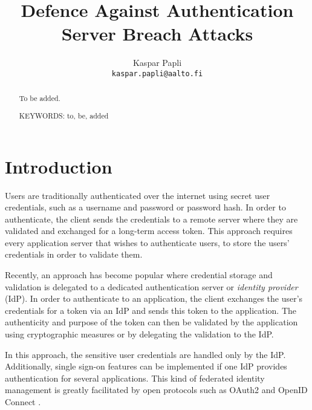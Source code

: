 \documentclass[article]{aaltoseries}
\begin{document}
 

\title{Defence Against Authentication Server Breach Attacks}

\author{Kaspar Papli
\\\textnormal{\texttt{kaspar.papli@aalto.fi}}}


\maketitle


\begin{abstract}
To be added.

\vspace{3mm}
\noindent KEYWORDS: to, be, added

\end{abstract}




\section{Introduction}

Users are traditionally authenticated over the internet using secret user credentials, such as a username and password or password hash. In order to authenticate, the client sends the credentials to a remote server where they are validated and exchanged for a long-term access token. This approach requires every application server that wishes to authenticate users, to store the users' credentials in order to validate them.

Recently, an approach has become popular where credential storage and validation is delegated to a dedicated authentication server or \textit{identity provider} (IdP). In order to authenticate to an application, the client exchanges the user's credentials for a token via an IdP and sends this token to the application. The authenticity and purpose of the token can then be validated by the application using cryptographic measures or by delegating the validation to the IdP.

In this approach, the sensitive user credentials are handled only by the IdP. Additionally, single sign-on features can be implemented if one IdP provides authentication for several applications. This kind of federated identity management is greatly facilitated by open protocols such as OAuth2 \cite{oauth2} and OpenID Connect \cite{oidc}.
\end{document}
